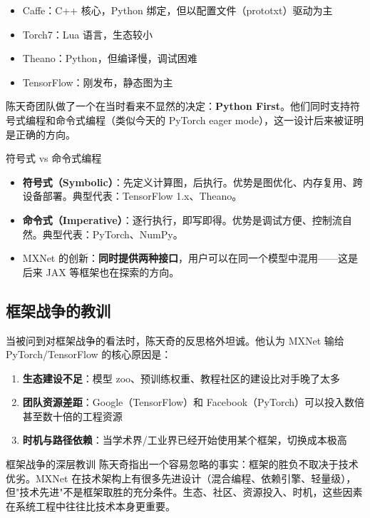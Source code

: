 \documentclass[a4paper]{article}
\begin{document}
\begin{itemize}
\item Caffe：C++ 核心，Python 绑定，但以配置文件（prototxt）驱动为主
\item Torch7：Lua 语言，生态较小
\item Theano：Python，但编译慢，调试困难
\item TensorFlow：刚发布，静态图为主
\end{itemize}

陈天奇团队做了一个在当时看来不显然的决定：\textbf{Python First}。他们同时支持符号式编程和命令式编程（类似今天的 PyTorch eager mode），这一设计后来被证明是正确的方向。

\begin{knowledgebox}{符号式 vs 命令式编程}
\begin{itemize}
\item \textbf{符号式（Symbolic）}：先定义计算图，后执行。优势是图优化、内存复用、跨设备部署。典型代表：TensorFlow 1.x、Theano。
\item \textbf{命令式（Imperative）}：逐行执行，即写即得。优势是调试方便、控制流自然。典型代表：PyTorch、NumPy。
\item MXNet 的创新：\textbf{同时提供两种接口}，用户可以在同一个模型中混用——这是后来 JAX 等框架也在探索的方向。
\end{itemize}
\end{knowledgebox}

\subsection{框架战争的教训}

当被问到对框架战争的看法时，陈天奇的反思格外坦诚。他认为 MXNet 输给 PyTorch/TensorFlow 的核心原因是：

\begin{enumerate}
\item \textbf{生态建设不足}：模型 zoo、预训练权重、教程社区的建设比对手晚了太多
\item \textbf{团队资源差距}：Google（TensorFlow）和 Facebook（PyTorch）可以投入数倍甚至数十倍的工程资源
\item \textbf{时机与路径依赖}：当学术界/工业界已经开始使用某个框架，切换成本极高
\end{enumerate}

\begin{warningbox}{框架战争的深层教训}
陈天奇指出一个容易忽略的事实：框架的胜负不取决于技术优劣。MXNet 在技术架构上有很多先进设计（混合编程、依赖引擎、轻量级），但"技术先进"不是框架取胜的充分条件。生态、社区、资源投入、时机，这些因素在系统工程中往往比技术本身更重要。
\end{warningbox}
\end{document}
